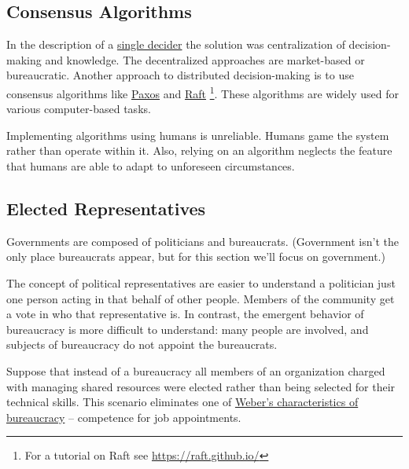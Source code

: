 \subsection*{Consensus Algorithms}

In the description of a \hyperref[sec:single-decider]{single decider}
the solution was centralization of decision-making and knowledge. The decentralized approaches are market-based or bureaucratic. Another approach to distributed decision-making is to use consensus algorithms like 
\href{https://en.wikipedia.org/wiki/Paxos_(computer_science)}{Paxos} and
\href{https://en.wikipedia.org/wiki/Raft_(algorithm)}{Raft}
\footnote{For a tutorial on Raft see \href{https://raft.github.io/}{https://raft.github.io/}}.
These algorithms are widely used for various computer-based tasks. 

Implementing algorithms using humans is unreliable. Humans game the system rather than operate within it. Also, relying on an algorithm neglects the feature that humans are able to adapt to unforeseen circumstances.

\subsection*{Elected Representatives}
Governments are composed of politicians and bureaucrats. (Government isn't the only place bureaucrats appear, but for this section we'll focus on government.)

The concept of political representatives are easier to understand a politician just one person acting in that behalf of other people. Members of the community get a vote in who that representative is.
In contrast, the emergent behavior of bureaucracy is more difficult to understand: many people are involved, and subjects of bureaucracy do not appoint the bureaucrats. 

Suppose that instead of a bureaucracy all members of an organization charged with managing \glspl{shared resource} were elected rather than being selected for their technical skills. This scenario eliminates one of \href{https://en.wikipedia.org/wiki/Bureaucracy#Max_Weber}{Weber's characteristics of bureaucracy}
-- competence for job appointments. 

